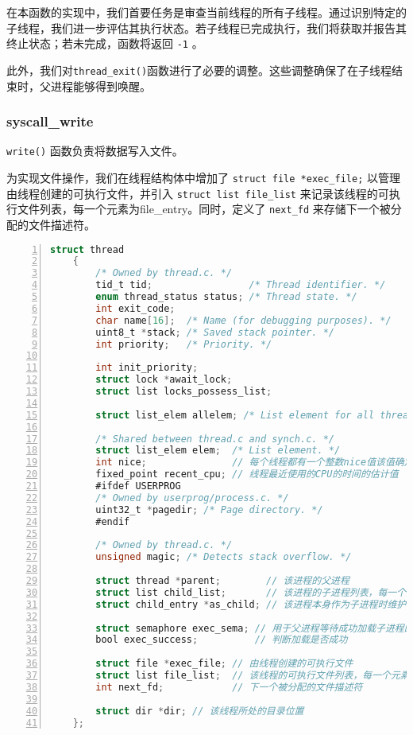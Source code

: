 \documentclass{article}
\begin{document}
	在本函数的实现中，我们首要任务是审查当前线程的所有子线程。通过识别特定的子线程，我们进一步评估其执行状态。若子线程已完成执行，我们将获取并报告其终止状态；若未完成，函数将返回 \texttt{-1} 。
	
	此外，我们对\texttt{thread\_exit()}函数进行了必要的调整。这些调整确保了在子线程结束时，父进程能够得到唤醒。
	
	\subsubsection{syscall\_write}
	
	\texttt{write()} 函数负责将数据写入文件。
	
	为实现文件操作，我们在线程结构体中增加了 \texttt{struct file *exec\_file;} 以管理由线程创建的可执行文件，并引入 \texttt{struct list file\_list} 来记录该线程的可执行文件列表，每一个元素为file\_entry。同时，定义了 \texttt{next\_fd} 来存储下一个被分配的文件描述符。
	
	\begin{lstlisting}[xleftmargin = 4em,xrightmargin = 4em, aboveskip = 1em, numbers = left, language = C,title=src/threads/thread.h - thread结构体]
    struct thread
    {
    	/* Owned by thread.c. */
    	tid_t tid;                 /* Thread identifier. */
    	enum thread_status status; /* Thread state. */
    	int exit_code;
    	char name[16];  /* Name (for debugging purposes). */
    	uint8_t *stack; /* Saved stack pointer. */
    	int priority;   /* Priority. */
    	
    	int init_priority;
    	struct lock *await_lock;
    	struct list locks_possess_list;
    	
    	struct list_elem allelem; /* List element for all threads list. */
    	
    	/* Shared between thread.c and synch.c. */
    	struct list_elem elem;  /* List element. */
    	int nice;               // 每个线程都有一个整数nice值该值确定该线程与其他线程应该有多“不错”[-20,20]
    	fixed_point recent_cpu; // 线程最近使用的CPU的时间的估计值
    	#ifdef USERPROG
    	/* Owned by userprog/process.c. */
    	uint32_t *pagedir; /* Page directory. */
    	#endif
    	
    	/* Owned by thread.c. */
    	unsigned magic; /* Detects stack overflow. */
    	
    	struct thread *parent;        // 该进程的父进程
    	struct list child_list;       // 该进程的子进程列表，每一个元素为child_entry类型的
    	struct child_entry *as_child; // 该进程本身作为子进程时维护的结构
    	
    	struct semaphore exec_sema; // 用于父进程等待成功加载子进程的可执行文件时的阻塞
    	bool exec_success;          // 判断加载是否成功
    	
    	struct file *exec_file; // 由线程创建的可执行文件
    	struct list file_list;  // 该线程的可执行文件列表，每一个元素为file_entry
    	int next_fd;            // 下一个被分配的文件描述符
    	
    	struct dir *dir; // 该线程所处的目录位置
    };
	\end{lstlisting}
	
\end{document}
